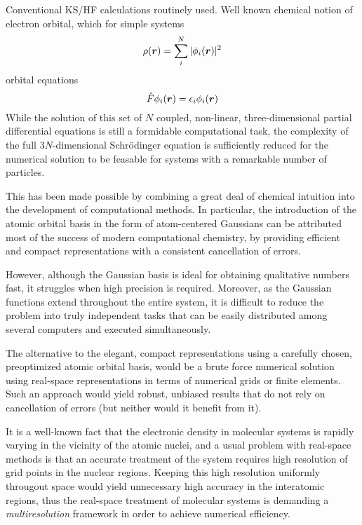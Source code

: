Conventional KS/HF calculations routinely used.
Well known chemical notion of electron orbital, which for simple systems 
\begin{equation}
    \rho(\boldsymbol r) = \sum_i^N |\phi_i(\boldsymbol r)|^2
\end{equation}
orbital equations
\begin{equation}
    \hat{F}\phi_i(\boldsymbol r) = \epsilon_i\phi_i(\boldsymbol r)
\end{equation}
While the solution of this set of $N$ coupled, non-linear, three-dimensional partial
differential equations is still a formidable computational task, the complexity of the 
full $3N$-dimensional Schr\"{o}dinger equation is sufficiently reduced for the numerical 
solution to be feasable for systems with a remarkable number of particles.

This has been made possible by combining a great deal of chemical intuition into the 
development of computational methods. In particular, the introduction of the atomic orbital 
basis in the form of atom-centered Gaussians can be attributed most of the success of modern 
computational chemistry, by providing efficient and compact representations with a consistent 
cancellation of errors. 

However, although the Gaussian basis is ideal for obtaining qualitative numbers fast, it 
struggles when high precision is required. Moreover, as the Gaussian functions extend 
throughout the entire system, it is difficult to reduce the problem into truly independent 
tasks that can be easily distributed among several computers and executed simultaneously.

The alternative to the elegant, compact representations using a carefully chosen, preoptimized 
atomic orbital basis, would be a brute force numerical solution using real-space representations 
in terms of numerical grids or finite elements. Such an approach would yield robust, unbiased
results that do not rely on cancellation of errors (but neither would it benefit from it).

It is a well-known fact that the electronic density in molecular systems is rapidly varying 
in the vicinity of the atomic nuclei, and a usual problem with real-space methods is that an 
accurate treatment of the system requires high resolution of grid points in the nuclear regions. 
Keeping this high resolution uniformly througout space would yield unnecessary high accuracy in 
the interatomic regions, thus the real-space treatment of molecular systems is demanding a 
\emph{multiresolution} framework in order to achieve numerical efficiency.

